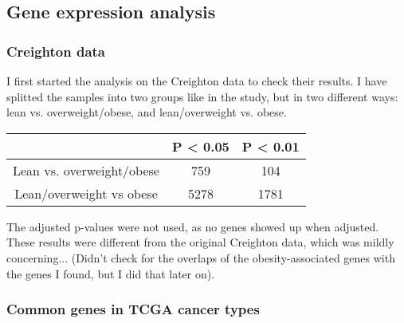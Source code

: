 \documentclass[a4paper, 11pt]{article}
\begin{document}
\subsection*{Gene expression analysis}

\subsubsection*{Creighton data}

I first started the analysis on the Creighton data to check their results.
I have splitted the samples into two groups like in the study, but in two different ways: lean vs. overweight/obese, and lean/overweight vs. obese.

\begin{center}
	\begin{tabular}{c|c|c}
                                  & P \textless{} 0.05 & P \textless{} 0.01 \\
		\hline
		Lean vs. overweight/obese & 759              & 104              \\
		Lean/overweight vs obese  & 5278             & 1781             \\
	\end{tabular}
\end{center}

The adjusted p-values were not used, as no genes showed up when adjusted.
These results were different from the original Creighton data, which was mildly concerning...
(Didn't check for the overlaps of the obesity-associated genes with the genes I found, but I did that later on).

\subsubsection*{Common genes in TCGA cancer types}
\end{document}
